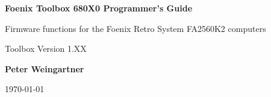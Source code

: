 \documentclass[10pt]{book}
\begin{document}
\lstset{language=C,basicstyle=\small,showstringspaces=false,columns=fullflexible,stringstyle=\ttfamily}

\begin{titlepage}
	\begin{center}
		\vspace*{1cm}
 
		\textbf{\Large Foenix Toolbox 680X0 Programmer's Guide}	
 
		\vspace{0.5cm}
		
		Firmware functions for the Foenix Retro System FA2560K2 computers

		\vspace{0.5cm}

		Toolbox Version 1.XX
			 
		\vspace{1.5cm}
 
		\textbf{Peter Weingartner}
 
		\vfill
	  
		\today
			 
	\end{center}
\end{titlepage}

\tableofcontents







\end{document}
